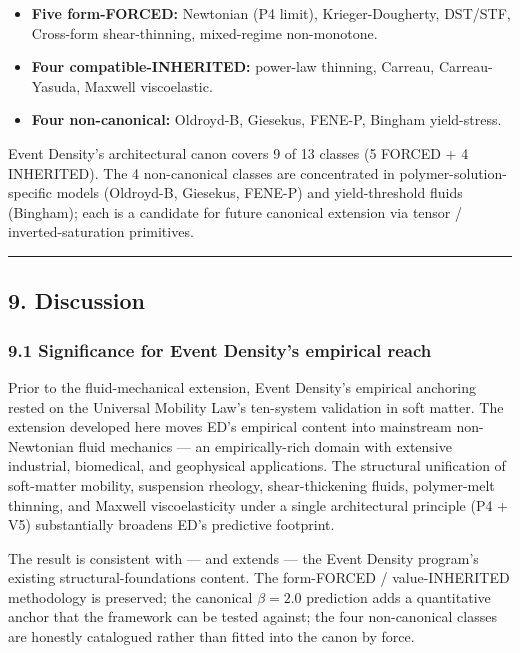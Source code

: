 \documentclass[
  11pt,a4paper]{article}
\providecommand{\tightlist}{%
  \setlength{\itemsep}{0pt}\setlength{\parskip}{0pt}}
\begin{document}
\begin{itemize}
\tightlist
\item
  \textbf{Five form-FORCED:} Newtonian (P4 limit), Krieger-Dougherty,
  DST/STF, Cross-form shear-thinning, mixed-regime non-monotone.
\item
  \textbf{Four compatible-INHERITED:} power-law thinning, Carreau,
  Carreau-Yasuda, Maxwell viscoelastic.
\item
  \textbf{Four non-canonical:} Oldroyd-B, Giesekus, FENE-P, Bingham
  yield-stress.
\end{itemize}

Event Density's architectural canon covers 9 of 13 classes (5 FORCED + 4
INHERITED). The 4 non-canonical classes are concentrated in
polymer-solution-specific models (Oldroyd-B, Giesekus, FENE-P) and
yield-threshold fluids (Bingham); each is a candidate for future
canonical extension via tensor / inverted-saturation primitives.

\begin{center}\rule{0.5\linewidth}{0.5pt}\end{center}

\subsection{9. Discussion}\label{discussion}

\subsubsection{9.1 Significance for Event Density's empirical
reach}\label{significance-for-event-densitys-empirical-reach}

Prior to the fluid-mechanical extension, Event Density's empirical
anchoring rested on the Universal Mobility Law's ten-system validation
in soft matter. The extension developed here moves ED's empirical
content into mainstream non-Newtonian fluid mechanics --- an
empirically-rich domain with extensive industrial, biomedical, and
geophysical applications. The structural unification of soft-matter
mobility, suspension rheology, shear-thickening fluids, polymer-melt
thinning, and Maxwell viscoelasticity under a single architectural
principle (P4 + V5) substantially broadens ED's predictive footprint.

The result is consistent with --- and extends --- the Event Density
program's existing structural-foundations content. The form-FORCED /
value-INHERITED methodology is preserved; the canonical \(\beta = 2.0\)
prediction adds a quantitative anchor that the framework can be tested
against; the four non-canonical classes are honestly catalogued rather
than fitted into the canon by force.
\end{document}
